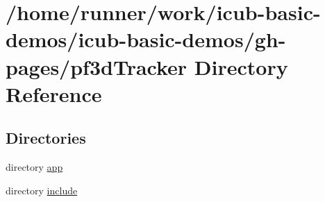 \section{/home/runner/work/icub-\/basic-\/demos/icub-\/basic-\/demos/gh-\/pages/pf3d\+Tracker Directory Reference}
\label{dir_b73a721c8cbb3e92535cc94daa204a01}
\subsection*{Directories}
\begin{DoxyCompactItemize}
\item 
directory \hyperlink{dir_9f0657da05b23c4879b50332cf355c63}{app}
\item 
directory \hyperlink{dir_46844ca6f7a7f72255313000c6b6b85e}{include}
\end{DoxyCompactItemize}
